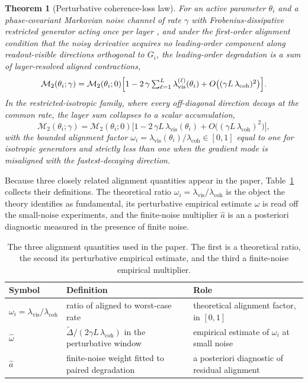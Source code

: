 \documentclass{article}
\newtheorem{theorem}{Theorem}
\newcommand{\Mtwo}{\mathcal{M}_2}
\newcommand{\lcoh}{\lambda_{\mathrm{coh}}}
\newcommand{\lvis}{\lambda_{\mathrm{vis}}}
\newcommand{\weff}{\widehat{\omega}}
\newcommand{\aeff}{\widehat{a}}
\begin{document}
\begin{theorem}[Perturbative coherence-loss law]\label{thm:perturb}
For an active parameter $\theta_i$ and a phase-covariant Markovian noise channel of rate $\gamma$ with Frobenius-dissipative restricted generator acting once per layer \cite{holevo1996,lindblad1976,gks1976}, and under the first-order alignment condition that the noisy derivative acquires no leading-order component along readout-visible directions orthogonal to $G_i$, the leading-order degradation is a sum of layer-resolved aligned contractions,
\begin{equation}
    \Mtwo(\theta_i;\gamma)
    =
    \Mtwo(\theta_i;0)
    \Bigl[1-2\,\gamma\textstyle\sum_{\ell=1}^{L}\lvis^{(\ell)}(\theta_i)+O\bigl((\gamma L\,\lcoh)^2\bigr)\Bigr].
    \label{eq:perturb}
\end{equation}
In the restricted-isotropic family, where every off-diagonal direction decays at the common rate, the layer sum collapses to a scalar accumulation,
\begin{equation}
    \Mtwo(\theta_i;\gamma)
    =
    \Mtwo(\theta_i;0)
    \bigl[1-2\,\gamma L\,\lvis(\theta_i)+O\bigl((\gamma L\,\lcoh)^2\bigr)\bigr],
    \label{eq:perturbscalar}
\end{equation}
with the bounded alignment factor $\omega_i=\lvis(\theta_i)/\lcoh\in[0,1]$ equal to one for isotropic generators and strictly less than one when the gradient mode is misaligned with the fastest-decaying direction.
\end{theorem}

Because three closely related alignment quantities appear in the paper, Table~\ref{tab:alignment} collects their definitions. The theoretical ratio $\omega_i=\lvis/\lcoh$ is the object the theory identifies as fundamental, its perturbative empirical estimate $\weff$ is read off the small-noise experiments, and the finite-noise multiplier $\aeff$ is an a posteriori diagnostic measured in the presence of finite noise.

\begin{table}[t]
\caption{The three alignment quantities used in the paper. The first is a theoretical ratio, the second its perturbative empirical estimate, and the third a finite-noise empirical multiplier.}\label{tab:alignment}
\centering
\begin{tabular}{@{}lll@{}}
\toprule
Symbol & Definition & Role\\
\midrule
$\omega_i=\lvis/\lcoh$ & ratio of aligned to worst-case rate & theoretical alignment factor, in $[0,1]$\\
$\weff$ & $\widetilde{\Delta}/(2\gamma L\,\lcoh)$ in the perturbative window & empirical estimate of $\omega_i$ at small noise\\
$\aeff$ & finite-noise weight fitted to paired degradation & a posteriori diagnostic of residual alignment\\
\bottomrule
\end{tabular}
\end{table}
\end{document}
